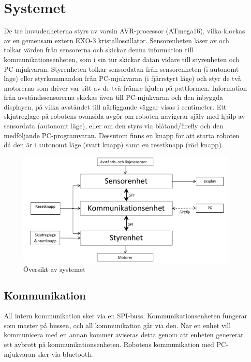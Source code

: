 %

\section{Systemet}

De tre huvudenheterna styrs av varsin AVR-processor (ATmega16), vilka klockas av en gemensam extern EXO-3 kristalloscillator. Sensorenheten läser av och tolkar värden från sensorerna och skickar denna information till kommunikationsenheten, som i sin tur skickar datan vidare till styrenheten och PC-mjukvaran. Styrenheten tolkar sensordatan från sensorenheten (i autonomt läge) eller styrkommandon från PC-mjukvaran (i fjärrstyrt läge) och styr de två motorerna som driver var sitt av de två främre hjulen på pattformen. Information från avståndssensorerna skickas även till PC-mjukvaran och den inbyggda displayen, på vilka avståndet till närliggande väggar visas i centimeter. 
Ett skjutreglage på robotens ovansida avgör om roboten navigerar själv med hjälp av sensordata (autonomt läge), eller om den styrs via blåtand/firefly och den medföljande PC-programvaran. Dessutom finns en knapp för att starta roboten då den är i autonomt läge (svart knapp) samt en resetknapp (röd knapp).

\begin{figure}[H]
  \centering
 \includegraphics[angle=0,scale=0.8]{bilder/systemoversikt.pdf}
  \caption{Översikt av systemet}
  \label{fig:system}
\end{figure}


\subsection{Kommunikation}
All intern kommunikation sker via en SPI-buss. Kommunikationsenheten fungerar som master på bussen, och all kommunikation går via den. När en enhet vill kommunicera med en annan kommer aviseras detta genom att enheten genererar ett avbrott på kommunikationsenheten. 
Robotens kommunikation med PC-mjukvaran sker via bluetooth.